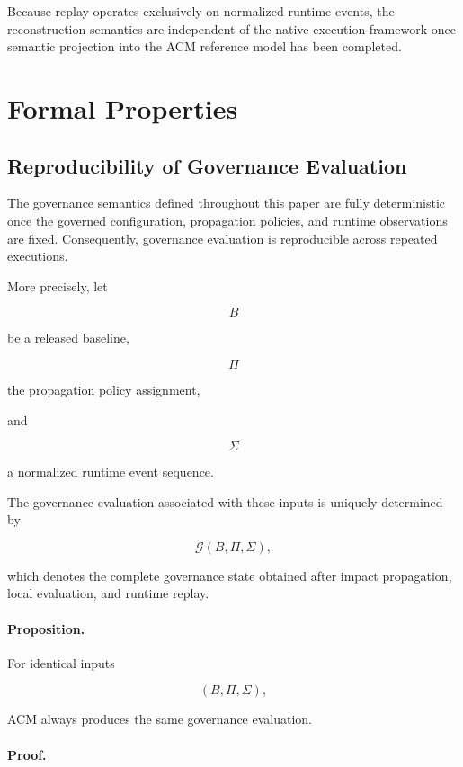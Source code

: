 \documentclass[10pt]{article}
\begin{document}
Because replay operates exclusively on normalized runtime events, the
reconstruction semantics are independent of the native execution framework once
semantic projection into the ACM reference model has been completed.

\section{Formal Properties}
\label{appendix:formal_properties}

\subsection{Reproducibility of Governance Evaluation}
\label{appendix:governance_reproducibility}

The governance semantics defined throughout this paper are fully deterministic
once the governed configuration, propagation policies, and runtime observations
are fixed. Consequently, governance evaluation is reproducible across repeated
executions.

More precisely, let

\[
B
\]

be a released baseline,

\[
\Pi
\]

the propagation policy assignment,

and

\[
\Sigma
\]

a normalized runtime event sequence.

The governance evaluation associated with these inputs is uniquely determined by

\[
\mathcal G(B,\Pi,\Sigma),
\]

which denotes the complete governance state obtained after impact propagation,
local evaluation, and runtime replay.

\paragraph*{Proposition.}

For identical inputs

\[
(B,\Pi,\Sigma),
\]

ACM always produces the same governance evaluation.

\paragraph*{Proof.}
\end{document}
